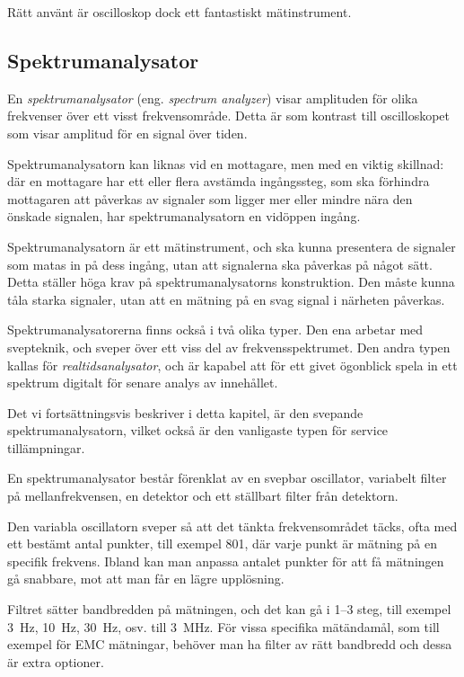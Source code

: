 Rätt använt är oscilloskop dock ett fantastiskt mätinstrument.

\subsection{Spektrumanalysator}
\label{spektrumanalysator}

En \emph{spektrumanalysator} (eng. \emph{spectrum analyzer}) visar amplituden
för olika frekvenser över ett visst frekvensområde.
Detta är som kontrast till oscilloskopet som visar amplitud för en signal
över tiden.

Spektrumanalysatorn kan liknas vid en mottagare, men med en viktig skillnad:
där en mottagare har ett eller flera avstämda ingångssteg, som ska förhindra
mottagaren att påverkas av signaler som ligger mer eller mindre nära den
önskade signalen, har spektrumanalysatorn en vidöppen ingång.

Spektrumanalysatorn är ett mätinstrument, och ska kunna presentera de
signaler som matas in på dess ingång, utan att signalerna ska påverkas på
något sätt.
Detta ställer höga krav på spektrumanalysatorns konstruktion.
Den måste kunna tåla starka signaler, utan att en mätning på en svag signal i
närheten påverkas.

Spektrumanalysatorerna finns också i två olika typer.
Den ena arbetar med svepteknik, och sveper över ett viss del av
frekvensspektrumet.
Den andra typen kallas för \emph{realtidsanalysator}, och är kapabel att för
ett givet ögonblick spela in ett spektrum digitalt för senare analys av
innehållet.

Det vi fortsättningsvis beskriver i detta kapitel, är den svepande
spektrumanalysatorn, vilket också är den vanligaste typen för
service tillämpningar.

En spektrumanalysator består förenklat av en svepbar oscillator, variabelt
filter på mellanfrekvensen, en detektor och ett ställbart filter från detektorn.

Den variabla oscillatorn sveper så att det tänkta frekvensområdet täcks, ofta
med ett bestämt antal punkter, till exempel 801, där varje punkt är mätning på
en specifik frekvens.
Ibland kan man anpassa antalet punkter för att få mätningen gå snabbare,
mot att man får en lägre upplösning.

Filtret sätter bandbredden på mätningen, och det kan gå i 1--3 steg, till
exempel \qty{3}{\hertz}, \qty{10}{\hertz}, \qty{30}{\hertz}, osv. till
\qty{3}{\mega\hertz}.
För vissa specifika mätändamål, som till exempel för EMC mätningar, behöver man
ha filter av rätt bandbredd och dessa är extra optioner.

